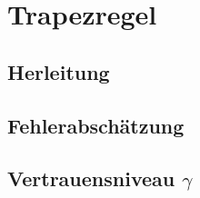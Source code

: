 
\section{Trapezregel}
\label{sec:trapezregel}

\subsection{Herleitung}
\label{sec:herleitung}

\subsection{Fehlerabschätzung}
\label{sec:fehlerabschätzung}

\subsection{Vertrauensniveau $\gamma$}
\label{sec:vertrauensniveau}
